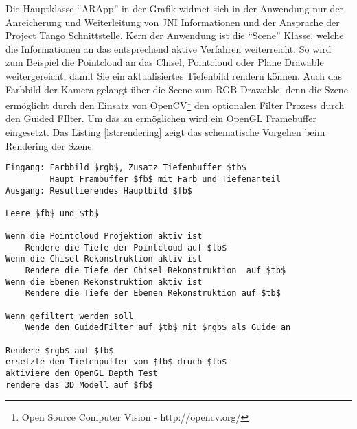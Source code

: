 Die Hauptklasse \enquote{ARApp} in der Grafik widmet sich in der Anwendung nur der Anreicherung und Weiterleitung von JNI Informationen und der Ansprache der Project Tango Schnittstelle. Kern der Anwendung ist die \enquote{Scene} Klasse, welche die Informationen an das entsprechend aktive Verfahren weiterreicht. So wird zum Beispiel die Pointcloud an das Chisel, Pointcloud oder Plane Drawable weitergereicht, damit Sie ein aktualisiertes Tiefenbild rendern können. Auch das Farbbild der Kamera gelangt über die Scene zum RGB Drawable, denn die Szene ermöglicht durch den Einsatz von OpenCV\footnote{Open Source Computer Vision - http://opencv.org/} den optionalen Filter Prozess durch den Guided FIlter. Um das zu ermöglichen wird ein OpenGL Framebuffer eingesetzt. Das Listing \ref{lst:rendering} zeigt das schematische Vorgehen beim Rendering der Szene.\\

\begin{lstlisting}[mathescape,caption=Rendering der Szene, label=lst:rendering]
Eingang: Farbbild $rgb$, Zusatz Tiefenbuffer $tb$
         Haupt Frambuffer $fb$ mit Farb und Tiefenanteil
Ausgang: Resultierendes Hauptbild $fb$

Leere $fb$ und $tb$

Wenn die Pointcloud Projektion aktiv ist
    Rendere die Tiefe der Pointcloud auf $tb$
Wenn die Chisel Rekonstruktion aktiv ist
    Rendere die Tiefe der Chisel Rekonstruktion  auf $tb$
Wenn die Ebenen Rekonstruktion aktiv ist
    Rendere die Tiefe der Ebenen Rekonstruktion auf $tb$
    
Wenn gefiltert werden soll
    Wende den GuidedFilter auf $tb$ mit $rgb$ als Guide an
        
Rendere $rgb$ auf $fb$ 
ersetzte den Tiefenpuffer von $fb$ druch $tb$
aktiviere den OpenGL Depth Test
rendere das 3D Modell auf $fb$
\end{lstlisting}